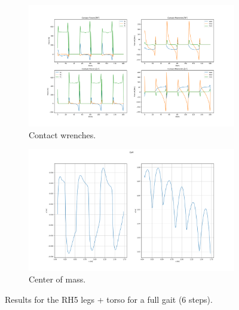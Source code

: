\begin{figure}[h!]
\begin{subfigure}{.5\textwidth}
\end{subfigure}
\medskip
\begin{subfigure}{.5\textwidth}
  	\centering
	\includegraphics[width=1\linewidth]{Media/Crocoddyl/RH5Torso/RH5TorsoGait_ContactWrenches.png}
	\caption{Contact wrenches.}
\end{subfigure}
\hfill
\begin{subfigure}{.5\textwidth}
  	\centering
	\includegraphics[width=1\linewidth]{Media/Crocoddyl/RH5Torso/RH5TorsoGait_CoM2.png}
	\caption{Center of mass.}
\end{subfigure}
\caption{Results for the RH5 legs + torso for a full gait (6 steps).}
\label{fig:rh5Torso_full_gait}
\centering
\end{figure}



